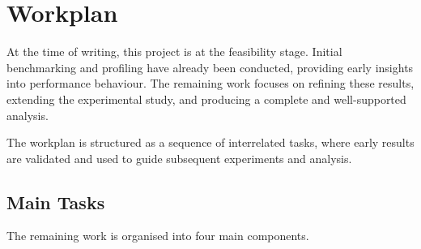 \documentclass{article}
\begin{document}
\section{Workplan}\label{s:plan}

At the time of writing, this project is at the feasibility stage. 
Initial benchmarking and profiling have already been conducted, 
providing early insights into performance behaviour. 
The remaining work focuses on refining these results, extending the experimental study, 
and producing a complete and well-supported analysis.

The workplan is structured as a sequence of interrelated tasks, 
where early results are validated and used to guide subsequent experiments and analysis.

\subsection{Main Tasks}

The remaining work is organised into four main components.
\end{document}
